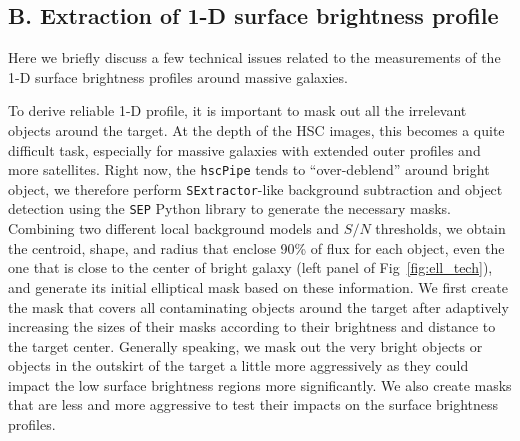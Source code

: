 \documentclass{emulateapj}
\begin{document}
\begin{CJK*}{UTF8}{gbsn}
    
\section{B. Extraction of 1-D surface brightness profile} 
    \label{app:ellipse} 
    
    Here we briefly discuss a few technical issues related to the measurements of the 
    1-D surface brightness profiles around massive galaxies. 
    
    To derive reliable 1-D profile, it is important to mask out all the irrelevant 
    objects around the target.
    At the depth of the HSC images, this becomes a quite difficult task, especially 
    for massive galaxies with extended outer profiles and more satellites. 
    Right now, the \texttt{hscPipe} tends to ``over-deblend'' around bright object, 
    we therefore perform \texttt{SExtractor}-like background subtraction and object 
    detection using the \texttt{SEP} Python library to generate the necessary masks.
    Combining two different local background models and $S/N$ thresholds, we obtain 
    the centroid, shape, and radius that enclose 90\% of flux for each object, even 
    the one that is close to the center of bright galaxy (left panel of 
    Fig~\ref{fig:ell_tech}), and generate its initial elliptical mask based on these
    information. 
    We first create the mask that covers all contaminating objects around the target 
    after adaptively increasing the sizes of their masks according to their brightness 
    and distance to the target center. 
    Generally speaking, we mask out the very bright objects or objects in the 
    outskirt of the target a little more aggressively as they could impact the 
    low surface brightness regions more significantly. 
    We also create masks that are less and more aggressive to test their impacts
    on the surface brightness profiles. 
    

\end{CJK*}
\end{document}
